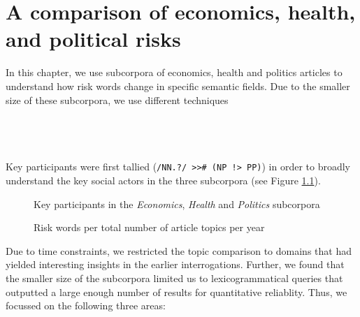 
\chapter{A comparison of economics, health, and political risks}

In this chapter, we use subcorpora of economics, health and politics articles to understand how risk words change in specific semantic fields. Due to the smaller size of these subcorpora, we use different techniques

\section{~}

Key participants were first tallied (\texttt{/NN.?/ \textgreater \textgreater \# (NP !> PP)}) in order to broadly understand the key social actors in the three subcorpora (see Figure \ref{fig:clouds}).

			\begin{figure}[htb!]
			\centering
			\caption{Key participants in the \emph{Economics}, \emph{Health} and \emph{Politics} subcorpora}
			\label{fig:clouds}
			\end{figure}

			\begin{figure}[htb!]
			\centering
			\caption{Risk words per total number of article topics per year}
			\label{fig:echepol_riskwords}
			\end{figure}
			Due to time constraints, we restricted the topic comparison to domains that had yielded interesting insights in the earlier interrogations. Further, we found that the smaller size of the subcorpora limited us to lexicogrammatical queries that outputted a large enough number of results for quantitative reliablity. Thus, we focussed on the following three areas:

